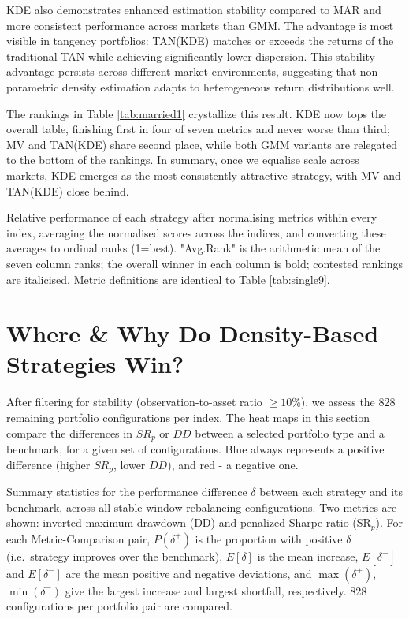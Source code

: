KDE also demonstrates enhanced estimation stability compared to MAR and more consistent performance across markets than GMM. The advantage is most visible in tangency portfolios: TAN(KDE) matches or exceeds the returns of the traditional TAN while achieving significantly lower dispersion. This stability advantage persists across different market environments, suggesting that non-parametric density estimation adapts to heterogeneous return distributions well.

The rankings in Table \ref{tab:married1} crystallize this result. KDE now tops the overall table, finishing first in four of seven metrics and never worse than third; MV and TAN(KDE) share second place, while both GMM variants are relegated to the bottom of the rankings. In summary, once we equalise scale across markets, KDE emerges as the most consistently attractive strategy, with MV and TAN(KDE) close behind.

\vspace{10mm}
\begin{table}[H]
  \centering
  
  \caption[Optimal strategy ranking]{Relative performance of each strategy after normalising metrics within every index, averaging the normalised scores across the indices, and converting these averages to ordinal ranks (1=best). "Avg.Rank" is the arithmetic mean of the seven column ranks; the overall winner in each column is bold; contested rankings are italicised. Metric definitions are identical to Table \ref{tab:single9}.}
  \label{tab:married1}
\end{table}

\newpage
\section{Where \& Why Do Density-Based Strategies Win?}
After filtering for stability (observation-to-asset ratio $\geq 10$\%), we assess the 828 remaining portfolio configurations per index. The heat maps in this section compare the differences in $SR_{p}$ or $DD$ between a selected portfolio type and a benchmark, for a given set of configurations. Blue always represents a positive difference (higher $SR_{p}$, lower $DD$), and red - a negative one. 
\vspace{10mm}
\begin{table}[H]
  \centering
  
  \caption[Metric comparison across all configurations]{Summary statistics for the performance difference $\delta$ between each strategy and its benchmark, across all stable window-rebalancing configurations. Two metrics are shown: inverted maximum drawdown (DD) and penalized Sharpe ratio (SR$_p$). For each Metric-Comparison pair, $P(\delta^+)$ is the proportion with positive $\delta$ (i.e.\ strategy improves over the benchmark), $E[\delta]$ is the mean increase, $E[\delta^+]$ and $E[\delta^-]$ are the mean positive and negative deviations, and $\max(\delta^+)$, $\min(\delta^-)$ give the largest increase and largest shortfall, respectively. 828 configurations per portfolio pair are compared.}
  \label{tab:single10}
\end{table}

